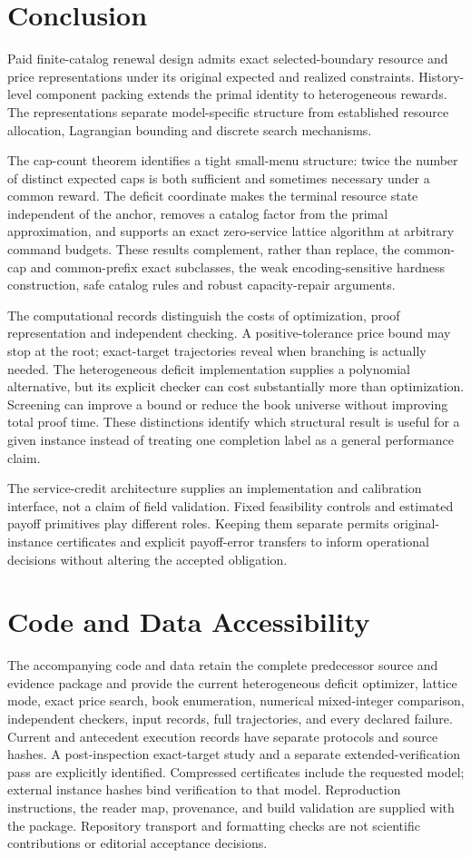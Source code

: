 \section{Conclusion}
Paid finite-catalog renewal design admits exact selected-boundary resource and price representations under its original expected and realized constraints. History-level component packing extends the primal identity to heterogeneous rewards. The representations separate model-specific structure from established resource allocation, Lagrangian bounding and discrete search mechanisms.

The cap-count theorem identifies a tight small-menu structure: twice the number of distinct expected caps is both sufficient and sometimes necessary under a common reward. The deficit coordinate makes the terminal resource state independent of the anchor, removes a catalog factor from the primal approximation, and supports an exact zero-service lattice algorithm at arbitrary command budgets. These results complement, rather than replace, the common-cap and common-prefix exact subclasses, the weak encoding-sensitive hardness construction, safe catalog rules and robust capacity-repair arguments.

The computational records distinguish the costs of optimization, proof representation and independent checking. A positive-tolerance price bound may stop at the root; exact-target trajectories reveal when branching is actually needed. The heterogeneous deficit implementation supplies a polynomial alternative, but its explicit checker can cost substantially more than optimization. Screening can improve a bound or reduce the book universe without improving total proof time. These distinctions identify which structural result is useful for a given instance instead of treating one completion label as a general performance claim.

The service-credit architecture supplies an implementation and calibration interface, not a claim of field validation. Fixed feasibility controls and estimated payoff primitives play different roles. Keeping them separate permits original-instance certificates and explicit payoff-error transfers to inform operational decisions without altering the accepted obligation.

\section*{Code and Data Accessibility}
The accompanying code and data retain the complete predecessor source and evidence package and provide the current heterogeneous deficit optimizer, lattice mode, exact price search, book enumeration, numerical mixed-integer comparison, independent checkers, input records, full trajectories, and every declared failure. Current and antecedent execution records have separate protocols and source hashes. A post-inspection exact-target study and a separate extended-verification pass are explicitly identified. Compressed certificates include the requested model; external instance hashes bind verification to that model. Reproduction instructions, the reader map, provenance, and build validation are supplied with the package. Repository transport and formatting checks are not scientific contributions or editorial acceptance decisions.
